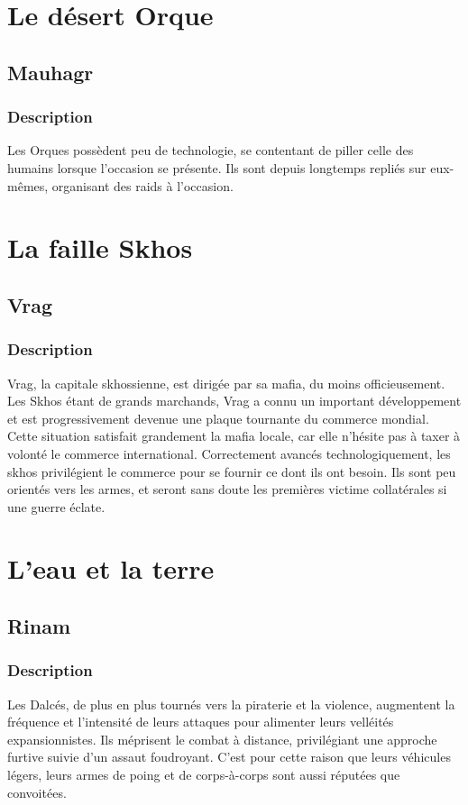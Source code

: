 \section{Le désert Orque}
\subsection{Mauhagr}
\subsubsection{Description}
Les Orques possèdent peu de technologie, se contentant de piller celle des humains lorsque l'occasion se présente. Ils sont depuis longtemps repliés sur eux-mêmes, organisant des raids à l'occasion.
\section{La faille Skhos}
\subsection{Vrag}
\subsubsection{Description}
Vrag, la capitale skhossienne, est dirigée par sa mafia, du moins officieusement. Les Skhos étant de grands marchands, Vrag a connu un important développement et est progressivement devenue une plaque tournante du commerce mondial. Cette situation satisfait grandement la mafia locale, car elle n'hésite pas à taxer à volonté le commerce international. Correctement avancés technologiquement, les skhos privilégient le commerce pour se fournir ce dont ils ont besoin. Ils sont peu orientés vers les armes, et seront sans doute les premières victime collatérales si une guerre éclate.
\section{L'eau et la terre}
\subsection{Rinam}
\subsubsection{Description}
Les Dalcés, de plus en plus tournés vers la piraterie et la violence, augmentent la fréquence et l'intensité de leurs attaques pour alimenter leurs velléités expansionnistes. Ils méprisent le combat à distance, privilégiant une approche furtive suivie d'un assaut foudroyant. C'est pour cette raison que leurs véhicules légers, leurs armes de poing et de corps-à-corps sont aussi réputées que convoitées.
